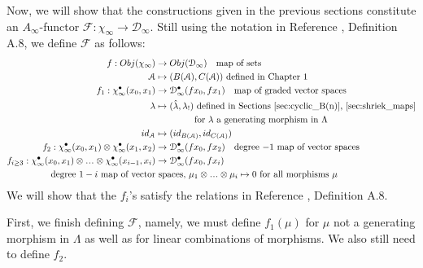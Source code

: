 Now, we will show that the constructions 
given in the previous sections constitute 
an $A_\infty$-functor $\mathcal{F}: 
\chi_\infty \to \mathcal{D}_\infty$. Still using 
the notation in Reference \cite{F}, 
Definition A.8, we define $\mathcal{F}$ 
as follows:
\begin{align*}
f: Obj(\chi_\infty) 
&\to 
Obj(\mathcal{D}_\infty)
\quad \textrm{map of sets}\\
\mathcal{A}
&\mapsto
(B(\mathcal{A}), C(\mathcal{A}))
\textrm{ defined in Chapter 1}\\
%
f_1: \chi_\infty^\bullet(x_0, x_1)
&\to
\mathcal{D}_\infty^\bullet(fx_0, fx_1)
\quad \textrm{map of graded vector spaces}\\
\lambda
&\mapsto 
(\hat{\lambda}, \lambda_!)
\textrm{ defined in Sections \ref{sec:cyclic_B(n)}, \ref{sec:shriek_maps}}\\
&\phantom{{}moveover{}}
  \textrm{for $\lambda$ a generating morphism in $\Lambda$}\\
id_{\mathcal{A}}
&\mapsto
(id_{B(\mathcal{A})}, id_{C(\mathcal{A})})\\
%  
f_2: \chi_\infty^\bullet(x_0, x_1)
  \otimes \chi_\infty^\bullet(x_1, x_2)
&\to
\mathcal{D}_\infty^\bullet(fx_0, fx_2)
\quad \textrm{degree $-1$ map of vector spaces}\\
%
f_{i\geq 3}: \chi_\infty^\bullet(x_0, x_1)
  \otimes \smdots \otimes 
  \chi_\infty^\bullet(x_{i-1}, x_i)
&\to 
\mathcal{D}_\infty^\bullet(fx_0, fx_i)\\
\textrm{degree $1-i$ map of vector}
&\textrm{ spaces, }
\mu_1 \otimes \smdots \otimes \mu_i
\mapsto
0 \textrm{ for all morphisms $\mu$}
\end{align*}
We will show that the $f_i$'s satisfy 
the relations in Reference \cite{F}, 
Definition A.8.

First, we finish defining $\mathcal{F}$, 
namely, we must define $f_1(\mu)$ for 
$\mu$ not a generating morphism in $\Lambda$ 
as well as for linear combinations of 
morphisms. We also still need to define $f_2$.


